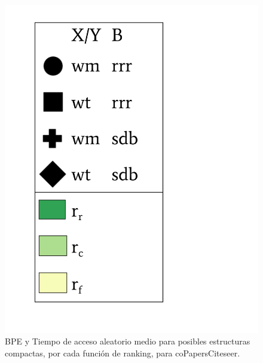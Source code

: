 \begin{frame}
\begin{figure}
\begin{minipage}{1\textwidth}
\begin{minipage}{0.15\textwidth}
    			\includegraphics[scale=.15, clip, trim=70 0 0 0]{../img/sdsl/label.pdf}
    		\end{minipage}	
    	\end{minipage}

	\caption{BPE y Tiempo de acceso aleatorio medio para posibles estructuras compactas, por cada función de ranking, para coPapersCiteseer.}
\end{figure}

\end{frame}


